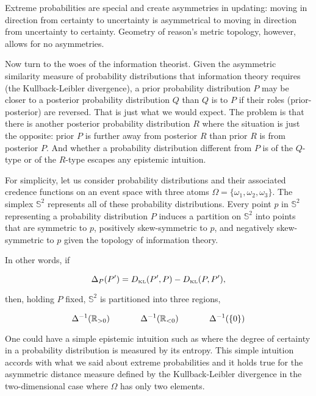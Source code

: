 \documentclass[11pt]{article}
\begin{document}
Extreme probabilities are special and create asymmetries in updating:
moving in direction from certainty to uncertainty is asymmetrical to
moving in direction from uncertainty to certainty. Geometry of
reason's metric topology, however, allows for no asymmetries.

Now turn to the woes of the information theorist. Given the asymmetric
similarity measure of probability distributions that information
theory requires (the Kullback-Leibler divergence), a prior probability
distribution $P$ may be closer to a posterior probability distribution
$Q$ than $Q$ is to $P$ if their roles (prior-posterior) are reversed.
That is just what we would expect. The problem is that there is
another posterior probability distribution $R$ where the situation is
just the opposite: prior $P$ is further away from posterior $R$ than
prior $R$ is from posterior $P$. And whether a probability
distribution different from $P$ is of the $Q$-type or of the $R$-type
escapes any epistemic intuition.

For simplicity, let us consider probability distributions and their
associated credence functions on an event space with three atoms
$\Omega=\{\omega_{1},\omega_{2},\omega_{3}\}$. The simplex
$\mathbb{S}^{2}$ represents all of these probability distributions.
Every point $p$ in $\mathbb{S}^{2}$ representing a probability
distribution $P$ induces a partition on $\mathbb{S}^{2}$ into points
that are symmetric to $p$, positively skew-symmetric to $p$, and
negatively skew-symmetric to $p$ given the topology of information
theory.

In other words, if

\begin{equation}
  \label{eq:sksy}
  \Delta_{P}(P')=D_{\mbox{\tiny KL}}(P',P)-D_{\mbox{\tiny KL}}(P,P'),
\end{equation}

then, holding $P$ fixed, $\mathbb{S}^{2}$ is partitioned into three
regions,

\begin{equation}
  \label{eq:sieruxis}
  \Delta^{-1}(\mathbb{R}_{>0})\hspace{.5in}\Delta^{-1}(\mathbb{R}_{<0})\hspace{.5in}\Delta^{-1}(\{0\})
\end{equation}

One could have a simple epistemic intuition such as 
where the degree of certainty in a probability distribution is
measured by its entropy. This simple intuition accords with what we
said about extreme probabilities and it holds true for the asymmetric
distance measure defined by the Kullback-Leibler divergence in the
two-dimensional case where $\Omega$ has only two elements.
\end{document}
